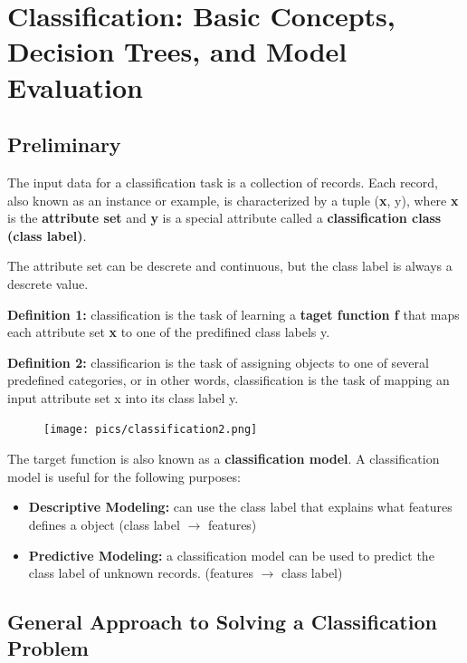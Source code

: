 \chapter{Classification: Basic Concepts, Decision Trees, and Model Evaluation}

	

	\clearpage

	\section{Preliminary}

		The input data for a classification task is a collection of records.
		Each record, also known as an instance or example, is characterized
		by a tuple ({\bf x}, y), where {\bf x} is the {\bf attribute set} and
		{\bf y} is a special attribute called a {\bf classification class (class label)}.

		The attribute set can be descrete and continuous, but the class label
		is always a descrete value. 

		{\bf Definition 1:} classification is the task of
		learning a {\bf taget function f} that maps each attribute set {\bf x}
		to one of the predifined class labels y.

		{\bf Definition 2:} classificarion is the task of assigning objects to one of several
		predefined categories, or in other words, classification is the task
		of mapping an input attribute set x into its class label y.

	\begin{figure}[H]
		\centering
		\texttt{[image: pics/classification2.png]}
	\end{figure}

		The target function is also known as a {\bf classification model}.
		A classification model is useful for the following purposes:
			\begin{itemize}
				\item {\bf Descriptive Modeling:} can use the class label that
				explains what features defines a object (class label $\rightarrow$ features)				
				\item {\bf Predictive Modeling:} a classification model can be
				used to predict the class label of unknown records. (features $\rightarrow$ class label)
			\end{itemize}

	\clearpage	
	\section{General Approach to Solving a Classification Problem}

